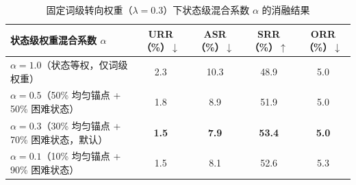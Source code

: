 \documentclass[fontset=fandol,type=master,campus=shenzhen,etitleauto=true]{hithesisbook}
\begin{document}
\begin{table}[htbp]
\centering
\caption{HS-Weighting 状态级困难权重与词级转向权重的 $2 \times 2$ 消融实验结果}
\label{tab:rtw-results}
\small
\setlength{\tabcolsep}{4pt}
\renewcommand{\arraystretch}{1.15}
\end{table}

\begin{table}[htbp]
\centering
\caption{固定词级转向权重（$\lambda=0.3$）下状态级混合系数 $\alpha$ 的消融结果}
\label{tab:recovery-sampling}
\small
\setlength{\tabcolsep}{4.5pt}
\renewcommand{\arraystretch}{1.15}
\begin{tabular}{l c c c c}
\toprule
\textbf{状态级权重混合系数 $\alpha$} & \textbf{URR（\%）$\downarrow$} & \textbf{ASR（\%）$\downarrow$} & \textbf{SRR（\%）$\uparrow$} & \textbf{ORR（\%）$\downarrow$} \\
\midrule
$\alpha=1.0$（状态等权，仅词级权重） & 2.3 & 10.3 & 48.9 & 5.0 \\
$\alpha=0.5$（50\% 均匀锚点 + 50\% 困难状态） & 1.8 & 8.9 & 51.9 & 5.0 \\
$\alpha=0.3$（30\% 均匀锚点 + 70\% 困难状态，默认） & \textbf{1.5} & \textbf{7.9} & \textbf{53.4} & \textbf{5.0} \\
$\alpha=0.1$（10\% 均匀锚点 + 90\% 困难状态） & 1.5 & 8.1 & 52.6 & 5.3 \\
\bottomrule
\end{tabular}
\end{table}
\end{document}
